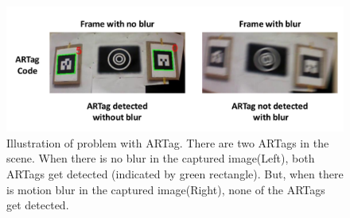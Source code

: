 \begin{itemize}
\begin{figure}[h!]
\centering
\includegraphics[width=0.98\linewidth]{figures/fiducial/ARTagBlur}
\caption[Problme of motion blur in ARTag]{Illustration of problem with ARTag.
There are two ARTags in the scene.
When there is no blur in the captured image(Left), both ARTags get detected
(indicated by green rectangle). But, when there is motion blur in the captured
image(Right), none of the ARTags get detected.}
\label{fig:ARTagBlur}
\end{figure}

\end{itemize}

